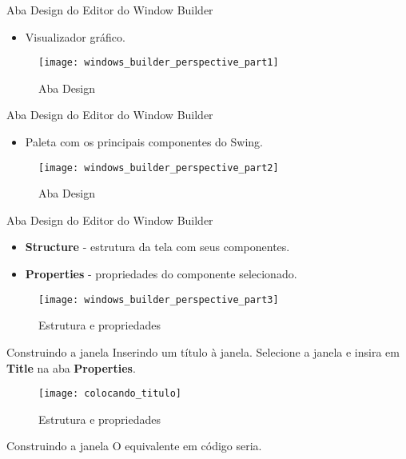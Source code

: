 \documentclass[10pt]{beamer}
\begin{document}
\begin{frame}{Aba Design do Editor do Window Builder}
\begin{itemize}
\item Visualizador gráfico.
\end{itemize}
  \begin{figure}[!htb]
    \centering
    \texttt{[image: windows\_builder\_perspective\_part1]}
    \caption{Aba Design}
    \label{figRotulo}
  \end{figure}
\end{frame}{}

\begin{frame}{Aba Design do Editor do Window Builder}
\begin{itemize}
\item Paleta com os principais componentes do Swing.
\end{itemize}
  \begin{figure}[!htb]
    \centering
    \texttt{[image: windows\_builder\_perspective\_part2]}
    \caption{Aba Design}
    \label{figRotulo}
  \end{figure}
\end{frame}{}

\begin{frame}{Aba Design do Editor do Window Builder}
\begin{itemize}
\item \textbf{Structure} - estrutura da tela com seus componentes.
\item \textbf{Properties} - propriedades do componente selecionado.
\end{itemize}
  \begin{figure}[!htb]
    \centering
    \texttt{[image: windows\_builder\_perspective\_part3]}
    \caption{Estrutura e propriedades}
    \label{figRotulo}
  \end{figure}
\end{frame}{}

\begin{frame}{Construindo a janela}
Inserindo um título à janela.
\linebreak
Selecione a janela e insira em \textbf{Title} na aba \textbf{Properties}.
  \begin{figure}[!htb]
    \centering
    \texttt{[image: colocando\_titulo]}
    \caption{Estrutura e propriedades}
    \label{figRotulo}
  \end{figure}
\end{frame}{}

\begin{frame}{Construindo a janela}
O equivalente em código seria.

\end{frame}{}
\end{document}

